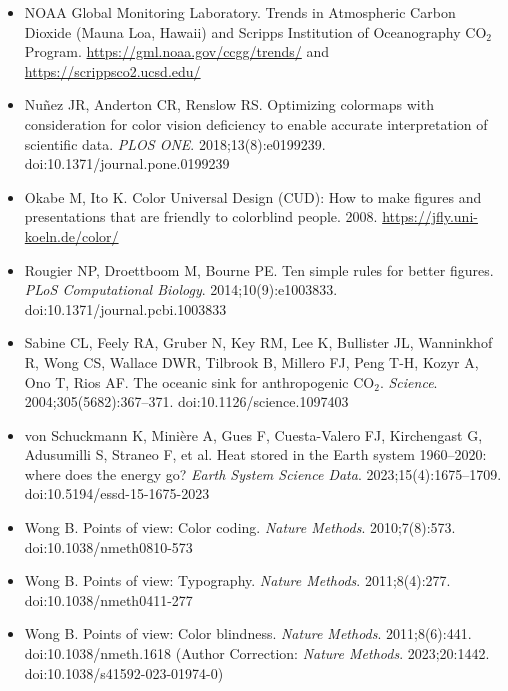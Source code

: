 {\begin{itemize}
\item NOAA Global Monitoring Laboratory. Trends in Atmospheric Carbon Dioxide (Mauna Loa, Hawaii) and Scripps Institution of Oceanography $\text{CO}_2$ Program. \url{https://gml.noaa.gov/ccgg/trends/} and \url{https://scrippsco2.ucsd.edu/}
\item Nu\~nez JR, Anderton CR, Renslow RS. Optimizing colormaps with consideration for color vision deficiency to enable accurate interpretation of scientific data. \textit{PLOS ONE}. 2018;13(8):e0199239. doi:10.1371/journal.pone.0199239
\item Okabe M, Ito K. Color Universal Design (CUD): How to make figures and presentations that are friendly to colorblind people. 2008. \url{https://jfly.uni-koeln.de/color/}
\item Rougier NP, Droettboom M, Bourne PE. Ten simple rules for better figures. \textit{PLoS Computational Biology}. 2014;10(9):e1003833. doi:10.1371/journal.pcbi.1003833
\item Sabine CL, Feely RA, Gruber N, Key RM, Lee K, Bullister JL, Wanninkhof R, Wong CS, Wallace DWR, Tilbrook B, Millero FJ, Peng T-H, Kozyr A, Ono T, Rios AF. The oceanic sink for anthropogenic $\text{CO}_2$. \textit{Science}. 2004;305(5682):367--371. doi:10.1126/science.1097403
\item von Schuckmann K, Mini\`ere A, Gues F, Cuesta-Valero FJ, Kirchengast G, Adusumilli S, Straneo F, et al. Heat stored in the Earth system 1960--2020: where does the energy go? \textit{Earth System Science Data}. 2023;15(4):1675--1709. doi:10.5194/essd-15-1675-2023
\item Wong B. Points of view: Color coding. \textit{Nature Methods}. 2010;7(8):573. doi:10.1038/nmeth0810-573
\item Wong B. Points of view: Typography. \textit{Nature Methods}. 2011;8(4):277. doi:10.1038/nmeth0411-277
\item Wong B. Points of view: Color blindness. \textit{Nature Methods}. 2011;8(6):441. doi:10.1038/nmeth.1618 (Author Correction: \textit{Nature Methods}. 2023;20:1442. doi:10.1038/s41592-023-01974-0)
\end{itemize}
\par}
